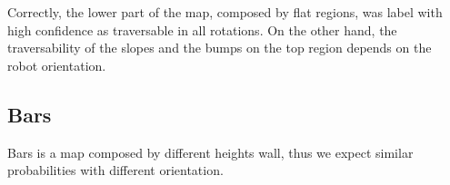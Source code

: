 \documentclass[../document.tex]{subfiles}
\begin{document}
 Correctly, the lower part of the map, composed by flat regions, was label with high confidence as traversable in all rotations. On the other hand, the traversability of the  slopes and the bumps on the top region depends on the robot orientation.
 
 
\subsection{Bars}
Bars is a map composed by different heights wall, thus we expect similar probabilities with different orientation.
\end{document}
